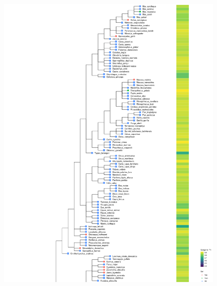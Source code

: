 \documentclass{article}
\begin{document}
\begin{figure}[!h]
\centerline{\includegraphics[width=1.2\textwidth]{images/animals_f1_scores_part1}}
\end{figure}
\end{document}
